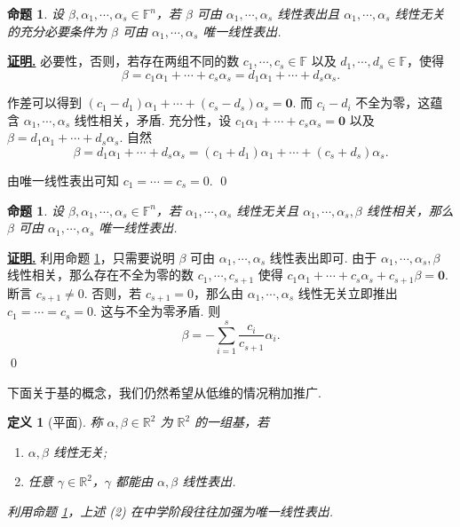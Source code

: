 \documentclass[10pt,openany]{article}
\theoremstyle{thmstyle} %
\theoremstyle{defstyle} %
\newtheorem{definition}[theorem]{定义}
\theoremstyle{prostyle} %
\newtheorem{proposition}[theorem]{命题}
\theoremstyle{exastyle}
\theoremstyle{remstyle}
\renewenvironment{proof}[1][证明]{\par\underline{\textbf{#1.}} \;\fangsong}{\qed\par}
\newcommand{\F}{\mathbb{F}}
\newcommand{\R}{\mathbb{R}}
\begin{document}
\begin{proposition} \label{2.3.8}
	设 \( \beta, \alpha_1,\cdots,\alpha_s \in \F^n \)，若 \( \beta \) 可由 \( \alpha_1,\cdots,\alpha_s \) 线性表出且 \( \alpha_1,\cdots,\alpha_s \) 线性无关的充分必要条件为  \( \beta \) 可由 \( \alpha_1,\cdots,\alpha_s \) 唯一线性表出.
\end{proposition}

\begin{proof}
	必要性，否则，若存在两组不同的数 \( c_1,\cdots,c_s \in \F  \) 以及 \( d_1,\cdots,d_s \in \F \)，使得
	\[ \beta=c_1\alpha_1+\cdots+c_s\alpha_s=d_1\alpha_1+\cdots+d_s\alpha_s. \]
	
	作差可以得到 \( (c_1-d_1)\alpha_1+\cdots+(c_s-d_s)\alpha_s=\bm{0} \). 而 \( c_i-d_i \) 不全为零，这蕴含 \( \alpha_1,\cdots,\alpha_s \) 线性相关，矛盾. 充分性，设 \( c_1\alpha_1+\cdots+c_s\alpha_s=\bm{0} \) 以及 \( \beta=d_1\alpha_1+\cdots+d_s\alpha_s \). 自然
	\[ \beta=d_1\alpha_1+\cdots+d_s\alpha_s=(c_1+d_1)\alpha_1+\cdots+(c_s+d_s)\alpha_s. \]
	
	由唯一线性表出可知 \( c_1=\cdots=c_s=0 \).
\end{proof}

\begin{proposition}
	设 \( \beta, \alpha_1,\cdots,\alpha_s \in \F^n \)，若  \( \alpha_1,\cdots,\alpha_s \) 线性无关且  \( \alpha_1,\cdots,\alpha_s,\beta \) 线性相关，那么   \( \beta \) 可由 \( \alpha_1,\cdots,\alpha_s \) 唯一线性表出.
\end{proposition}

\begin{proof}
	利用命题 \ref{2.3.8}，只需要说明   \( \beta \) 可由 \( \alpha_1,\cdots,\alpha_s \) 线性表出即可. 由于   \( \alpha_1,\cdots,\alpha_s,\beta \) 线性相关，那么存在不全为零的数 \( c_1,\cdots,c_{s+1} \) 使得 \( c_1\alpha_1+\cdots+c_s\alpha_s+c_{s+1}\beta=\bm{0} \). 断言 \( c_{s+1} \neq 0 \). 否则，若 \( c_{s+1}=0 \)，那么由   \( \alpha_1,\cdots,\alpha_s \) 线性无关立即推出 \( c_1=\cdots=c_s=0 \). 这与不全为零矛盾. 则
	\[ \beta= -\sum_{i=1}^{s} \frac{c_i}{c_{s+1}} \alpha_i. \]
\end{proof}

下面关于基的概念，我们仍然希望从低维的情况稍加推广.

\begin{definition}[平面] \label{2.3.10}
	称 \( \alpha, \beta \in \R^2 \) 为 \( \R^2 \) 的一组基，若
	\begin{enumerate}[(1)]
		\item \( \alpha,\beta \) 线性无关;
		\item 任意 \( \gamma \in \R^2 \)，\( \gamma \) 都能由 \( \alpha,\beta \) 线性表出.
	\end{enumerate}
	利用命题 \ref{2.3.8}，上述 (2) 在中学阶段往往加强为唯一线性表出.
\end{definition}
\end{document}
